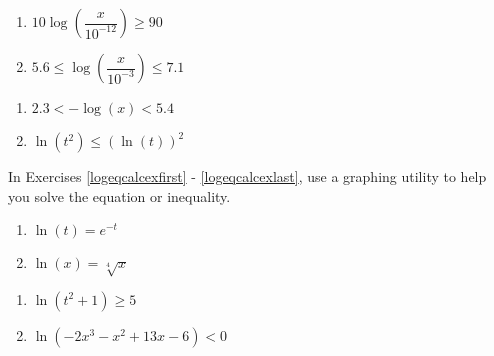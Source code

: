 \documentclass{ximera}
\begin{document}
\begin{multicols}{2}
\begin{enumerate}
\setcounter{enumi}{\value{HW}}

\item $10\log\left(\dfrac{x}{10^{-12}}\right) \geq 90$ \label{sixfourdecibelineq} 
\item $5.6 \leq \log\left(\dfrac{x}{10^{-3}}\right) \leq 7.1$ \label{sixfourRichterineq}


\setcounter{HW}{\value{enumi}}
\end{enumerate}
\end{multicols}

\begin{multicols}{2}
\begin{enumerate}
\setcounter{enumi}{\value{HW}}


\item $2.3 < -\log(x) < 5.4$ \label{sixfourpHineq} 

\item $\ln(t^{2}) \leq (\ln(t))^{2}$ \label{solvelogineqexlast} 

\setcounter{HW}{\value{enumi}}
\end{enumerate}
\end{multicols}

\pagebreak

In Exercises \ref{logeqcalcexfirst} - \ref{logeqcalcexlast}, use a graphing utility to help you solve the equation or  inequality.

\begin{multicols}{2}
\begin{enumerate}
\setcounter{enumi}{\value{HW}}

\item $\ln(t) = e^{-t}$ \label{logeqcalcexfirst} 
\item $\ln(x) = \sqrt[4]{x}$ 

\setcounter{HW}{\value{enumi}}
\end{enumerate}
\end{multicols}

\begin{multicols}{2}
\begin{enumerate}
\setcounter{enumi}{\value{HW}}

\item $\ln(t^{2} + 1) \geq 5$
\item $\ln(-2x^{3} - x^{2} + 13x - 6) < 0$ \label{logeqcalcexlast} 

\setcounter{HW}{\value{enumi}}
\end{enumerate}
\end{multicols}
\end{document}
